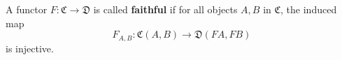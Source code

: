 A functor $F: \mathfrak{C} \to \mathfrak{D}$ is called \textbf{faithful} if for all objects $A, B$ in $\mathfrak{C}$, the induced map
$$F_{A,B}: \mathfrak{C}(A, B) \to \mathfrak{D}(FA, FB)$$
is injective.
